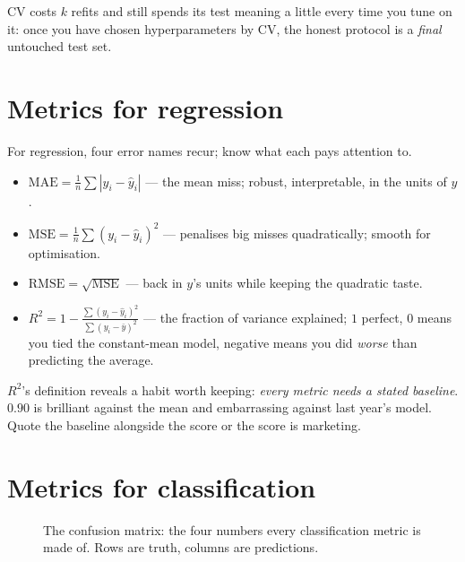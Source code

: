CV costs $k$ refits and still spends its test meaning a little every time
you tune on it: once you have chosen hyperparameters by CV, the honest
protocol is a \emph{final} untouched test set.

\section{Metrics for regression}\label{sec:regmetrics}

For regression, four error names recur; know what each pays attention to.

\begin{itemize}
\item $\mathrm{MAE} = \frac{1}{n}\sum |y_i - \hat y_i|$ --- the mean
  miss; robust, interpretable, in the units of $y$.
\item $\mathrm{MSE} = \frac{1}{n}\sum (y_i - \hat y_i)^2$ --- penalises
  big misses quadratically; smooth for optimisation.
\item $\mathrm{RMSE} = \sqrt{\mathrm{MSE}}$ --- back in $y$'s units while
  keeping the quadratic taste.
\item $R^2 = 1 - \frac{\sum(y_i-\hat y_i)^2}{\sum(y_i-\bar y)^2}$ --- the
  fraction of variance explained; $1$ perfect, $0$ means you tied the
  constant-mean model, negative means you did \emph{worse} than predicting
  the average.
\end{itemize}

\begin{checkpoint}
$R^2$'s definition reveals a habit worth keeping: \emph{every metric needs
a stated baseline}. $0.90$ is brilliant against the mean and embarrassing
against last year's model. Quote the baseline alongside the score or the
score is marketing.
\end{checkpoint}

\section{Metrics for classification}\label{sec:clsmetrics}

\begin{figure}[ht]\centering
{}
\caption{The confusion matrix: the four numbers
every classification metric is made of. Rows are truth, columns are
predictions.}\label{fig:confmat}
\end{figure}

